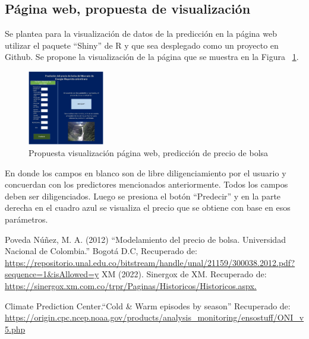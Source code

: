 \documentclass[conference, 10pt]{IEEEtran}
\begin{document}
\subsection{Página web, propuesta de visualización} \label{sec:web}
Se plantea para la visualización de datos de la predicción en la página web utilizar el paquete ``Shiny'' de R y que sea desplegado como un proyecto en Github. Se propone la visualización de la página que se muestra en la Figura ~\ref{fig1}.
\begin{figure}[htbp]
\centerline{\includegraphics[width=0.3\textwidth]{../Images/Propuesta_webpage.PNG}}
\caption{Propuesta visualización página web, predicción de precio de bolsa}
\label{fig1}
\end{figure}

En donde los campos en blanco son de libre diligenciamiento por el usuario y concuerdan con los predictores mencionados anteriormente. Todos los campos deben ser diligenciados. Luego se presiona el botón ``Predecir'' y en la parte derecha en el cuadro azul se visualiza el precio que se obtiene con base en esos parámetros.

\nocite{*}



\begin{thebibliography}{00}
 Poveda Núñez, M. A. (2012) “Modelamiento del precio de bolsa. Universidad Nacional de Colombia.” Bogotá D.C, Recuperado de: \url{https://repositorio.unal.edu.co/bitstream/handle/unal/21159/300038.2012.pdf?sequence=1&isAllowed=y}
 XM (2022). Sinergox de XM. Recuperado de: \url{ https://sinergox.xm.com.co/trpr/Paginas/Historicos/Historicos.aspx.} 

Climate Prediction Center.“Cold \& Warm episodes by season” Recuperado de: \url{https://origin.cpc.ncep.noaa.gov/products/analysis_monitoring/ensostuff/ONI_v5.php}
\end{thebibliography}
\end{document}
